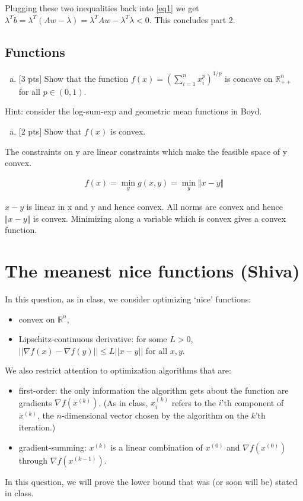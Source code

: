 \documentclass[12pt]{article}
\begin{document}
Plugging these two inequalities back into \ref{eq1} we get $\lambda^Tb = \lambda^T(Aw-\lambda) = \lambda^TAw - \lambda^T\lambda < 0$. This concludes part 2. 


\subsection{Functions}

\begin{enumerate}[(a)]
\item
$[$3 pts$]$  Show that the function $f(x) = \left( \sum_{i=1}^n x_i^p\right)^{1/p}$ is concave on $\mathbb{R}^n_{++}$ for all $p\in(0,1)$.
\end{enumerate}
Hint: consider the log-sum-exp and geometric mean functions in Boyd.

\vspace{.5cm}

\begin{enumerate}[(b)]
\item
$[$2 pts$]$  Show that $f(x)$ is convex.
\end{enumerate}

The constraints on y are linear constraints which make the feasible space of y convex. 

\begin{align*}
f(x) = \min_y g(x,y) = \min_y \Vert x - y \Vert 
\end{align*}

$x-y$ is linear in x and y and hence convex. All norms are convex and hence $\Vert x - y \Vert$ is convex. Minimizing along a variable which is convex gives a convex function. 
\newpage
\clearpage


\section{The meanest nice functions (Shiva)}

In this question, as in class, we consider optimizing `nice' functions: \begin{itemize}
\item convex on $\mathbb{R}^n$,
\item Lipschitz-continuous derivative: for some $L > 0$, $||\nabla f(x) - \nabla f(y)|| \leq L ||x - y||$ for all $x,y$.
\end{itemize}
We also restrict attention to optimization algorithms that are:
\begin{itemize}
\item first-order: the only information the algorithm gets about the function are gradients $\nabla f(x^{(k)})$. (As in class, $x^{(k)}_i$ refers to the $i$'th component of $x^{(k)}$, the $n$-dimensional vector chosen by the algorithm on the $k$'th iteration.)
\item gradient-summing: $x^{(k)}$ is a linear combination of $x^{(0)}$ and $\nabla f(x^{(0)})$ through $\nabla f(x^{(k-1)})$. 
\end{itemize}
In this question, we will prove the lower bound that was (or soon will be) stated in class.
\end{document}
